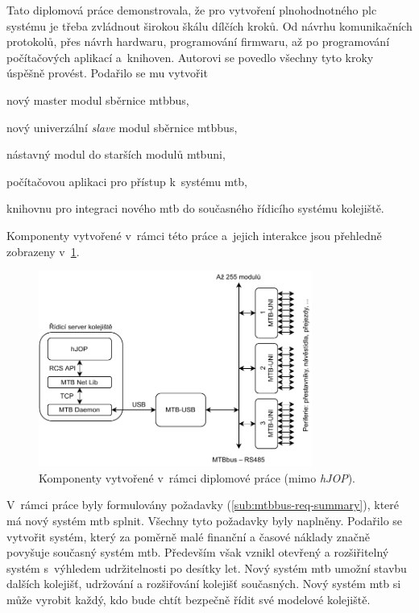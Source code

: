 Tato diplomová práce demonstrovala, že pro vytvoření plnohodnotného \gls{plc}
systému je třeba zvládnout širokou škálu dílčích kroků. Od návrhu komunikačních
protokolů, přes návrh hardwaru, programování firmwaru, až po programování
počítačových aplikací a~knihoven. Autorovi se povedlo všechny tyto kroky
úspěšně provést. Podařilo se mu vytvořit

\begin{compactitem}
\item nový master modul sběrnice \gls{mtbbus},
\item nový univerzální \textit{slave} modul sběrnice \gls{mtbbus},
\item nástavný modul do starších modulů \gls{mtbuni},
\item počítačovou aplikaci pro přístup k~systému \gls{mtb},
\item knihovnu pro integraci nového \gls{mtb} do současného řídicího systému
	kolejiště.
\end{compactitem}

Komponenty vytvořené v~rámci této práce a~jejich interakce jsou přehledně
zobrazeny v~\ref{fig:new-topology}.

\begin{figure}[ht]
\includegraphics[width=0.8\textwidth]{data/new-topology.pdf}
\caption{Komponenty vytvořené v~rámci diplomové práce (mimo \textit{hJOP}).}
\label{fig:new-topology}
\end{figure}

V~rámci práce byly formulovány požadavky (\ref{sub:mtbbus-req-summary}), které
má nový systém \gls{mtb} splnit. Všechny tyto požadavky byly naplněny.
Podařilo se vytvořit systém, který za poměrně malé finanční a časové náklady
značně povyšuje současný systém \gls{mtb}. Především však vznikl otevřený
a rozšiřitelný systém s~výhledem udržitelnosti po desítky let. Nový systém
\gls{mtb} umožní stavbu dalších kolejišť, udržování a rozšiřování kolejišť
současných. Nový systém \gls{mtb} si může vyrobit každý, kdo bude chtít bezpečně
řídit své modelové kolejiště.

